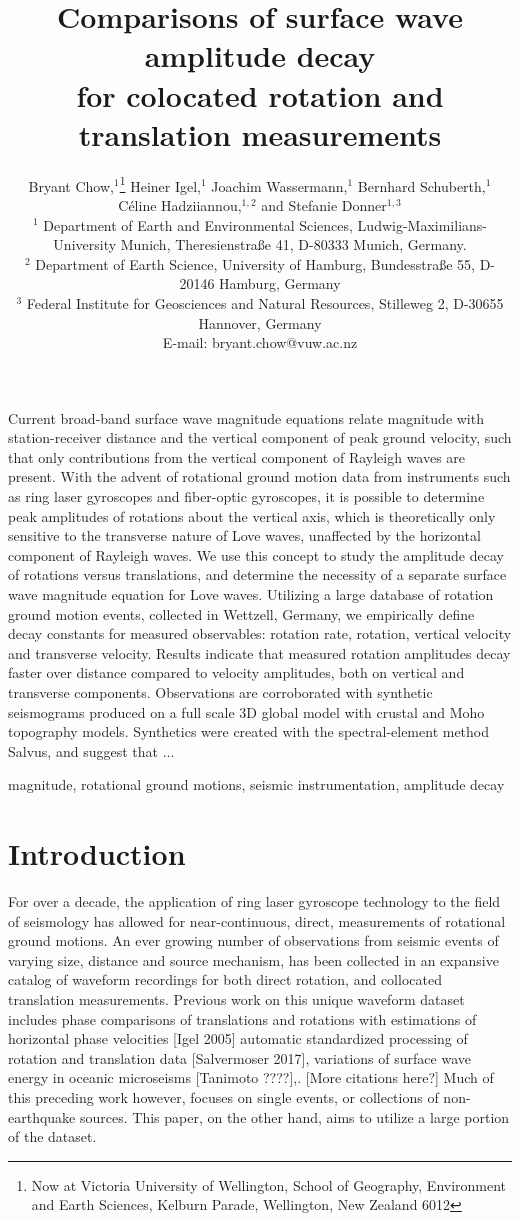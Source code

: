 \documentclass{gji}
\title[Comparisons of surface wave amplitude decay]
  {Comparisons of surface wave amplitude decay \\for colocated rotation and translation measurements}
\author[Bryant Chow]
  {Bryant Chow,$^1$\thanks{Now at Victoria University of Wellington, School of Geography, Environment and Earth Sciences, Kelburn Parade, Wellington, New Zealand 6012} 
  Heiner Igel,$^1$ 
  Joachim Wassermann,$^1$
  Bernhard Schuberth,$^1$  \vspace{2mm}\\
  \LARGE{{\normalfont C\' eline Hadziiannou,$^{1,2}$ and
  Stefanie Donner$^{1,3}$}}\vspace{2mm}\\
  $^1$ Department of Earth and Environmental Sciences, Ludwig-Maximilians-University Munich, Theresienstra\ss e 41, D-80333 Munich, Germany.\\
  $^2$ Department of Earth Science, University of Hamburg, Bundesstra\ss e 55, D-20146 Hamburg, Germany\\
  $^3$ Federal Institute for Geosciences and Natural Resources, Stilleweg 2, D-30655 Hannover, Germany \\E-mail: bryant.chow@vuw.ac.nz
  }
\date{}
\begin{document}
\label{firstpage}

\maketitle

\begin{summary}
Current broad-band surface wave magnitude equations relate magnitude with station-receiver distance and the vertical component of peak ground velocity, such that only contributions from the vertical component of Rayleigh waves are present. With the advent of rotational ground motion data from instruments such as ring laser gyroscopes and fiber-optic gyroscopes, it is possible to determine peak amplitudes of rotations about the vertical axis, which is theoretically only sensitive to the transverse nature of Love waves, unaffected by the horizontal component of Rayleigh waves. We use this concept to study the amplitude decay of rotations versus translations, and determine the necessity of a separate surface wave magnitude equation for Love waves. Utilizing a large database of rotation ground motion events, collected in Wettzell, Germany, we empirically define decay constants for measured observables: rotation rate, rotation, vertical velocity and transverse velocity. Results indicate that measured rotation amplitudes decay faster over distance compared to velocity amplitudes, both on vertical and transverse components. Observations are corroborated with synthetic seismograms produced on a full scale 3D global model with crustal and Moho topography models. Synthetics were created with the spectral-element method Salvus, and suggest that ...
\end{summary}

\begin{keywords}
magnitude, rotational ground motions, seismic instrumentation, amplitude decay
\end{keywords}

\section{Introduction} 
For over a decade, the application of ring laser gyroscope technology to the field of seismology has allowed for near-continuous, direct, measurements of rotational ground motions. An ever growing number of observations from seismic events of varying size, distance and source mechanism, has been collected in an expansive catalog of waveform recordings for both direct rotation, and collocated translation measurements.
Previous work on this unique waveform dataset includes phase comparisons of translations and rotations with estimations of horizontal phase velocities [Igel 2005] %
automatic standardized processing of rotation and translation data [Salvermoser 2017],
variations of surface wave energy in oceanic microseisms [Tanimoto ????],. [More citations here?] %
Much of this preceding work however, focuses on single events, or collections of non-earthquake sources. This paper, on the other hand, aims to utilize a large portion of the dataset.
\end{document}
